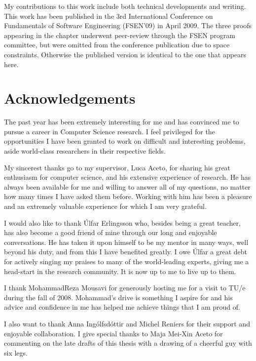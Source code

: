 My contributions to this work include both technical developments and writing.
This work has been published in the 3rd International Conference on
Fundamentals of Software Engineering (FSEN'09) in April 2009. The three proofs
appearing in the chapter underwent peer-review through the FSEN program committee,
but were omitted from the conference publication due to space constraints. Otherwise
the published version is identical to the one that appears here.


\section{Acknowledgements}

The past year has been extremely interesting for me and has convinced me to 
pursue a career in Computer Science research. I feel privileged for the opportunities
I have been granted to work on difficult and interesting problems, aside world-class
researchers in their respective fields.

My sincerest thanks go to my supervisor, Luca Aceto, for sharing his great
enthusiasm for computer science, and his extensive experience of research. 
He has always been available for me and willing to answer all of my questions,
no matter how many times I have asked them before.
Working with him has been a pleasure and an extremely valuable experience for which
I am very grateful.

I would also like to thank {\'U}lfar Erlingsson who, besides being a great teacher,
has also become a good friend of mine through our long and enjoyable conversations.
He has taken it upon himself to be my mentor in many ways, well beyond his duty, 
and from this I have benefited greatly.
I owe {\'U}lfar a great debt for actively singing my praises to many of the world-leading
experts, giving me a head-start in the research community.
It is now up to me to live up to them.

I thank MohammadReza Mousavi for generously hosting me for a visit
to TU/e during the fall of 2008. Mohammad's drive is something I aspire for
and his advice and confidence in me has helped me achieve things that I am
proud of.

I also want to thank Anna Ing{\'o}lfsd{\'o}ttir and Michel Reniers for their
support and enjoyable collaboration. I give special thanks to Maja Mei-Xin Aceto
for commenting on the late drafts of this thesis with a drawing of a cheerful 
guy with six legs.

